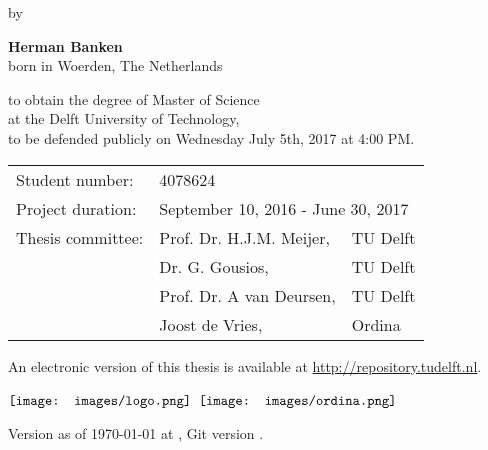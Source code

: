 \begin{minipage}[t][0.99\textheight]{0.99\textwidth}
    \begin{center}
        \vspace*{1cm}
        
        \Huge
        \textbf{\thesistitle}
        
        \large
		\vspace{0.5cm}
		by
        \vspace{0.5cm}
        
        \Large
        \textbf{Herman Banken}\\
		\normalsize
        born in Woerden, The Netherlands
        
        \vspace{1cm}
        \vfill

		to obtain the degree of Master of Science\\
		at the Delft University of Technology,\\
		to be defended publicly on Wednesday July 5th, 2017 at 4:00 PM.
        
        \vspace{0.8cm}
                
		\begin{tabular}{l l l}
		Student number:     & \multicolumn{2}{l}{4078624} \\
		Project duration:   & \multicolumn{2}{l}{September 10, 2016 - June 30, 2017} \\
		Thesis committee:   & Prof. Dr. H.J.M. Meijer, 	& TU Delft \\
    						& Dr. G. Gousios,           & TU Delft \\
    						& Prof. Dr. A van Deursen,  & TU Delft \\
    						& Joost de Vries,           & Ordina
		\end{tabular}

        \vspace{0.8cm}

		An electronic version of this thesis is available at \url{http://repository.tudelft.nl}.

\begin{minipage}{6in}
  \centering
  $\vcenter{\hbox{\texttt{[image: images/logo.png]}}}$
  \hspace*{.2in}
  $\vcenter{\hbox{\texttt{[image: images/ordina.png]}}}$
\end{minipage}

\small
Version as of {\today}
at \currenttime, Git version \gitrevision.
        
    \end{center}
\end{minipage}